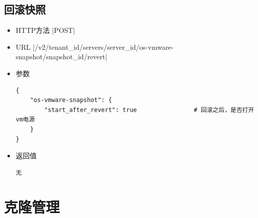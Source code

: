 \documentclass[oneside]{book}
\begin{document}
\section{回滚快照}
\begin{itemize}
\item HTTP方法
|POST|
\item URL
|/v2/{tenant_id}/servers/{server_id}/os-vmware-snapshot/{snapshot_id}/revert|
\item 参数
\begin{verbatim}
{
    "os-vmware-snapshot": {
        "start_after_revert": true                # 回滚之后，是否打开vm电源
    }
}
\end{verbatim}
\item 返回值
\begin{verbatim}
无
\end{verbatim}
\end{itemize}

\chapter{克隆管理}
\end{document}
